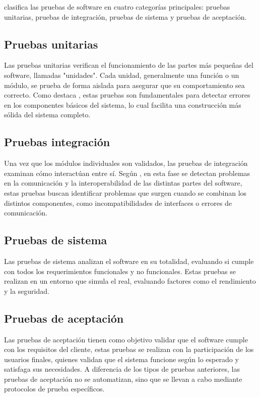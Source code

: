 		\textcite{sommerville2011introduccion} clasifica las pruebas de software en cuatro categorías principales: pruebas unitarias, pruebas de integración, pruebas de sistema y pruebas de aceptación.
		
	\subsection{Pruebas unitarias}
		Las pruebas unitarias verifican el funcionamiento de las partes más pequeñas del software, llamadas "unidades". Cada unidad, generalmente una función o un módulo, se prueba de forma aislada para asegurar que su comportamiento sea correcto. Como destaca \textcite{pressman2010ingenieria}, estas pruebas son fundamentales para detectar errores en los componentes básicos del sistema, lo cual facilita una construcción más sólida del sistema completo.
	\subsection{Pruebas integración}
		Una vez que los módulos individuales son validados, las pruebas de integración examinan cómo interactúan entre sí. Según \textcite{sommerville2011introduccion}, en esta fase se detectan problemas en la comunicación y la interoperabilidad de las distintas partes del software, estas pruebas buscan identificar problemas que surgen cuando se combinan los distintos componentes, como incompatibilidades de interfaces o errores de comunicación. 
	\subsection{Pruebas de sistema}
		Las pruebas de sistema analizan el software en su totalidad, evaluando si cumple con todos los requerimientos funcionales y no funcionales. Estas pruebas se realizan en un entorno que simula el real, evaluando factores como el rendimiento y la seguridad.
	\subsection{Pruebas de aceptación}
		Las pruebas de aceptación tienen como objetivo validar que el software cumple con los requisitos del cliente, estas pruebas se realizan con la participación de los usuarios finales, quienes validan que el sistema funcione según lo esperado y satisfaga sus necesidades. A diferencia de los tipos de pruebas anteriores, las pruebas de aceptación no se automatizan, sino que se llevan a cabo mediante protocolos de prueba específicos.	
